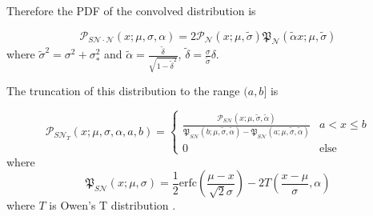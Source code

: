 \documentclass[twocolumn]{aastex631}
\newcommand{\mfk}[1]{\mathfrak{#1}}
\newcommand{\mcal}[1]{\mathcal{#1}}
\newcommand{\pdf}{\mcal{P}}
\newcommand{\cdf}{\mfk{P}}
\begin{document}
        Therefore the PDF of the convolved distribution is 

        \begin{equation}
            \pdf_{S\mcal{N}\cdot\mcal{N}}(x;\mu,\sigma,\alpha) = 2\pdf_{\mcal{N}}(x;\mu,\tilde{\sigma})\cdf_{\mcal{N}}(\tilde{\alpha} x;\mu,\tilde{\sigma})
        \end{equation}
        where $\tilde\sigma^2 = \sigma^2 + \sigma_*^2$ and $\tilde{\alpha} = \frac{\tilde{\delta}}{\sqrt{1-\tilde{\delta}^2}}$, $\tilde{\delta} = \frac{\sigma}{\tilde{\sigma}}\delta$.

        The truncation of this distribution to the range $(a, b]$ is

       \begin{equation}
            \pdf_{S\mcal{N}_T}(x; \mu, \sigma, \alpha, a, b)
                = \begin{cases}
                    \frac{\pdf_{S\mcal{N}}(x; \mu, \tilde\sigma, \tilde\alpha)}{\cdf_{S\mcal{N}}(b; \mu, \tilde\sigma, \tilde\alpha) - \cdf_{S\mcal{N}}(a; \mu, \tilde\sigma, \tilde\alpha)} & a < x \leq b \\
                    0 & \text{else}
                \end{cases}
        \end{equation}
        where
        \begin{equation}
            \cdf_{S\mcal{N}}(x; \mu, \sigma) = \frac{1}{2} \text{erfc}\left(\frac{\mu -x}{\sqrt{2} \sigma }\right)-2 T\left(\frac{x-\mu }{\sigma },\alpha \right)
        \end{equation}
        where $T$ is Owen's T distribution \citep{Owen_1956}.






\end{document}
